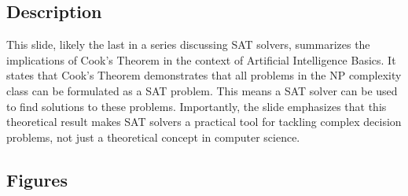 \documentclass{article}%
\begin{document}
\subsection{Description}%
This slide, likely the last in a series discussing SAT solvers, summarizes the implications of Cook's Theorem in the context of Artificial Intelligence Basics.  It states that Cook's Theorem demonstrates that all problems in the NP complexity class can be formulated as a SAT problem.  This means a SAT solver can be used to find solutions to these problems.  Importantly, the slide emphasizes that this theoretical result makes SAT solvers a practical tool for tackling complex decision problems, not just a theoretical concept in computer science.%
\subsection{Figures}%
\begin{figure}[H]%
\centering%
\end{figure}

%
\newpage%
\end{document}
